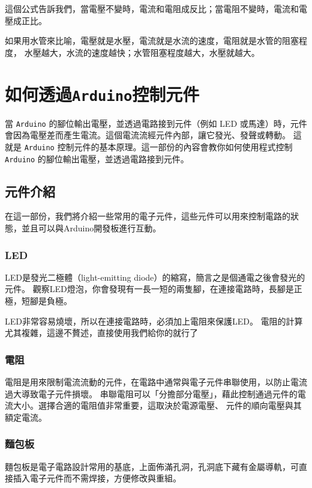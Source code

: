 \documentclass[12pt,a4paper]{article}
\begin{document}
這個公式告訴我們，當電壓不變時，電流和電阻成反比；當電阻不變時，電流和電壓成正比。

如果用水管來比喻，電壓就是水壓，電流就是水流的速度，電阻就是水管的阻塞程度，
水壓越大，水流的速度越快；水管阻塞程度越大，水壓就越大。

\section{如何透過\texttt{Arduino}控制元件}

當 \texttt{Arduino} 的腳位輸出電壓，並透過電路接到元件（例如 LED 或馬達）時，元件會因為電壓差而產生電流。這個電流流經元件內部，讓它發光、發聲或轉動。
這就是 \texttt{Arduino} 控制元件的基本原理。這一部份的內容會教你如何使用程式控制 \texttt{Arduino} 的腳位輸出電壓，並透過電路接到元件。

\subsection{元件介紹}
在這一部份，我們將介紹一些常用的電子元件，這些元件可以用來控制電路的狀態，並且可以與Arduino開發板進行互動。

\subsubsection{LED}

LED是發光二極體（light-emitting diode）的縮寫，簡言之是個通電之後會發光的元件。
觀察LED燈泡，你會發現有一長一短的兩隻腳，在連接電路時，長腳是正極，短腳是負極。

LED非常容易燒壞，所以在連接電路時，必須加上電阻來保護LED。
電阻的計算尤其複雜，這邊不贅述，直接使用我們給你的就行了

\subsubsection{電阻}
電阻是用來限制電流流動的元件，在電路中通常與電子元件串聯使用，以防止電流過大導致電子元件損壞。
串聯電阻可以「分擔部分電壓」，藉此控制通過元件的電流大小。選擇合適的電阻值非常重要，這取決於電源電壓、
元件的順向電壓與其額定電流。


\subsubsection{麵包板}

麵包板是電子電路設計常用的基底，上面佈滿孔洞，孔洞底下藏有金屬導軌，可直接插入電子元件而不需焊接，方便修改與重組。
\end{document}
